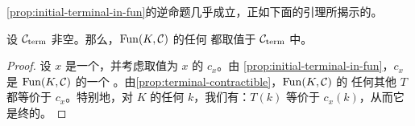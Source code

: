 \cref{prop:initial-terminal-in-fun}的逆命题几乎成立，正如下面的引理所揭示的。

\begin{lemma}\label{lem:terminal-values}
设 $\mathcal{C}_{\mathrm{term}}$ 非空。那么，$\mathrm{Fun}(K, \mathcal{C})$ 的任何\trTerminalObject{}%
都取值于 $\mathcal{C}_{\mathrm{term}}$ 中。
\end{lemma}

\begin{proof}
设 $x$ 是一个\trTerminalObject{}，并考虑取值为 $x$ 的\trConstantFunctor{} $c_x$。由%
\cref{prop:initial-terminal-in-fun}，$c_x$ 是 $\mathrm{Fun}(K, \mathcal{C})$ 的一个%
\trTerminalObject{}。由\cref{prop:terminal-contractible}，$\mathrm{Fun}(K, \mathcal{C})$ 的
任何其他\trTerminalObject{} $T$ 都等价于 $c_x$。特别地，对 $K$ 的任何\trObject{}%
$k$，我们有：$T(k)$ 等价于 $c_x(k)$，从而它是终的。
\end{proof}
